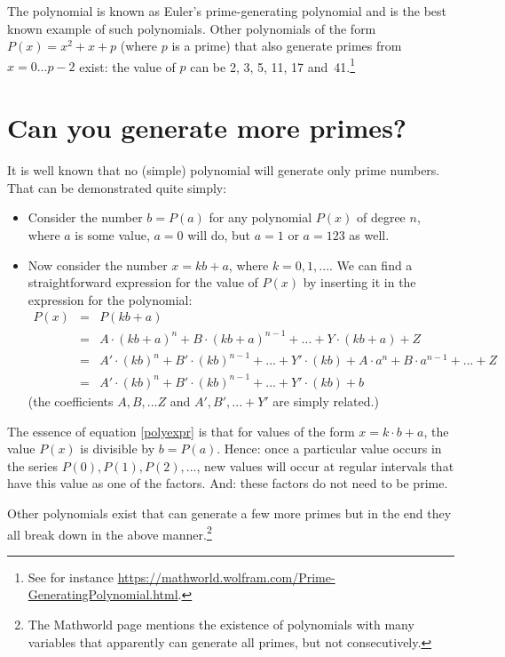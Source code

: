 \documentclass[onecolumn]{article}
\begin{document}
The polynomial is known as Euler's prime-generating polynomial and is the best known example
of such polynomials. Other polynomials of the form $P(x) = x^2 + x + p$ (where $p$ is a prime)
that also generate primes from $x = 0 ... p-2$ exist: the value of $p$ can be 2, 3, 5, 11, 17 and~41.\footnote{See for instance \url{https://mathworld.wolfram.com/Prime-GeneratingPolynomial.html}.}

\section*{Can you generate more primes?}

It is well known that no (simple) polynomial will generate only prime numbers. That can be demonstrated quite
simply:
\begin{itemize}
\item
Consider the number $b = P(a)$ for any polynomial $P(x)$ of degree $n$, where $a$ is some value, $a = 0$ will do, but $a = 1$ or $a = 123$ as well.
\item
Now consider the number $x = k b + a$, where $k = 0, 1, ...$. We can find a straightforward expression for the value of $P(x)$ by
inserting it in the expression for the polynomial:
\begin{eqnarray}
\label{polyexpr}
\nonumber    P(x) &=& P(k b + a) \\
\nonumber         &=& A \cdot (k b + a)^n + B \cdot (k b + a)^{n-1} + ... + Y \cdot (k b + a) + Z \\
\nonumber         &=& A' \cdot (k b)^n + B' \cdot (k b)^{n-1} + ... + Y' \cdot (k b) + A \cdot a^n + B \cdot a^{n-1} + ... + Z \\
                  &=& A' \cdot (k b)^n + B' \cdot (k b)^{n-1} + ... + Y' \cdot (k b) + b
\end{eqnarray}
\noindent (the coefficients $A, B, ... Z$ and $A', B', ... + Y'$ are simply related.)
\end{itemize}

The essence of equation \ref{polyexpr} is that for values of the form $x = k \cdot b + a$, the value $P(x)$ is divisible by $b = P(a)$. Hence:
once a particular value occurs in the series $P(0), P(1), P(2), ...$, new values will occur at regular intervals that have this value as one of the factors.
And: these factors do not need to be prime.

Other polynomials exist that can generate a few more primes but in the end they all break down in the above manner.\footnote{The Mathworld page mentions
the existence of polynomials with many variables that apparently can generate all primes, but not consecutively.}
\end{document}

